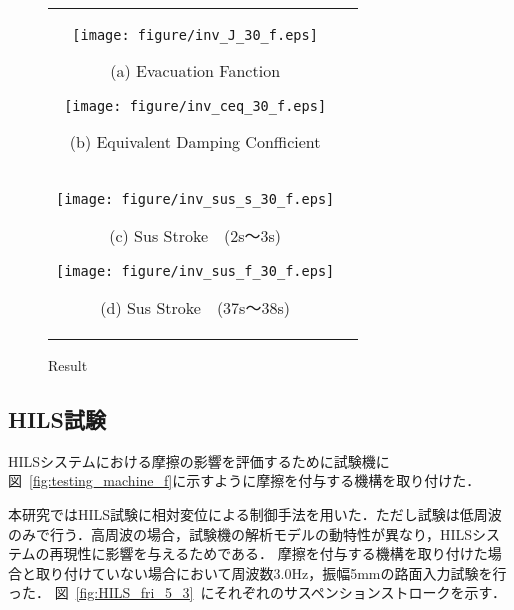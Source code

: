 \documentclass[a4paper,12pt]{article_vdlab_sotsuron}
\begin{document}
    \begin{figure}[h!]
        \begin{tabular}{cc}
          \begin{minipage}{0.5\hsize}
            \centering
            \texttt{[image: figure/inv\_J\_30\_f.eps]}
            \begin{center}
              \vspace{-4mm}
              \ (a) Evacuation Fanction\
            \end{center}
          \end{minipage}
          \begin{minipage}{0.5\hsize}
            \centering
            \texttt{[image: figure/inv\_ceq\_30\_f.eps]}
            \begin{center}
              \vspace{-4mm}
              \ (b)  Equivalent Damping Confficient\
            \end{center}
          \end{minipage}\\
            \begin{minipage}{0.5\hsize}
              \centering
              \texttt{[image: figure/inv\_sus\_s\_30\_f.eps]}
              \begin{center}
                \vspace{-4mm}
                \ (c) Sus Stroke　(2s～3s)\
              \end{center}
            \end{minipage}
            \begin{minipage}{0.5\hsize}
              \centering
              \texttt{[image: figure/inv\_sus\_f\_30\_f.eps]}
              \begin{center}
                \vspace{-4mm}
                \ (d) Sus Stroke　(37s～38s)\
              \end{center}
            \end{minipage}
          \end{tabular}
          \vspace{-1mm}
        \caption{Result}
        \label{fig:sim_GD_test_inv_30_f}
    \end{figure}

\newpage
\subsection{HILS試験}
HILSシステムにおける摩擦の影響を評価するために試験機に図~\ref{fig:testing_machine_f}に示すように摩擦を付与する機構を取り付けた．
\par
本研究ではHILS試験に相対変位による制御手法を用いた．ただし試験は低周波のみで行う．高周波の場合，試験機の解析モデルの動特性が異なり，HILSシステムの再現性に影響を与えるためである．
摩擦を付与する機構を取り付けた場合と取り付けていない場合において周波数3.0Hz，振幅5mmの路面入力試験を行った．
図~\ref{fig:HILS_fri_5_3}~にそれぞれのサスペンションストロークを示す．
\end{document}
